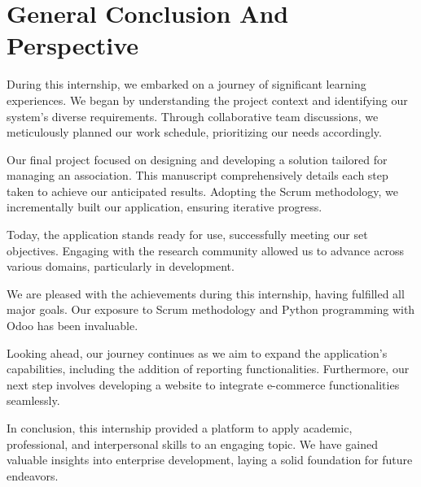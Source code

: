 \chapter*{General Conclusion And Perspective}
During this internship, we embarked on a journey of significant learning experiences. We began by understanding the project context and identifying our system's diverse requirements. Through collaborative team discussions, we meticulously planned our work schedule, prioritizing our needs accordingly.

Our final project focused on designing and developing a solution tailored for managing an association. This manuscript comprehensively details each step taken to achieve our anticipated results. Adopting the Scrum methodology, we incrementally built our application, ensuring iterative progress.

Today, the application stands ready for use, successfully meeting our set objectives. Engaging with the research community allowed us to advance across various domains, particularly in development.

We are pleased with the achievements during this internship, having fulfilled all major goals. Our exposure to Scrum methodology and Python programming with Odoo has been invaluable.

Looking ahead, our journey continues as we aim to expand the application's capabilities, including the addition of reporting functionalities. Furthermore, our next step involves developing a website to integrate e-commerce functionalities seamlessly.

In conclusion, this internship provided a platform to apply academic, professional, and interpersonal skills to an engaging topic. We have gained valuable insights into enterprise development, laying a solid foundation for future endeavors.


